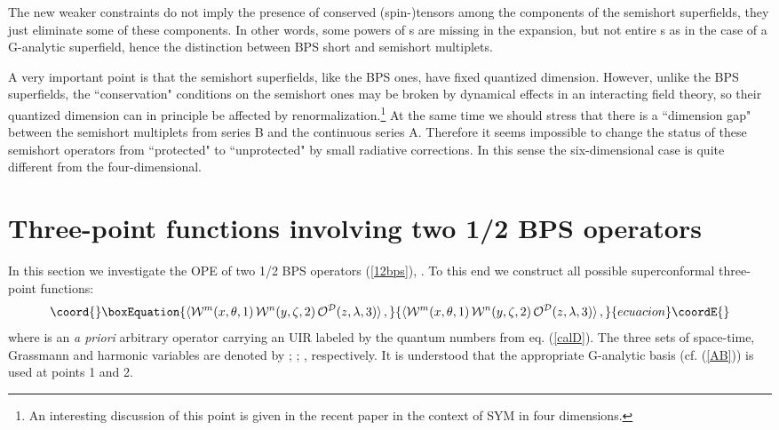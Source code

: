 \documentclass[a4paper,11pt]{article}
\begin{document}
The new weaker constraints do not imply the presence of conserved
(spin-)tensors among the components of the semishort superfields,
they just eliminate some of these components. In other words, some
powers of \myHighlight{$\theta$}\coordHE{}s are missing in the expansion, but not entire
\myHighlight{$\theta^\alpha$}\coordHE{}s as in the case of a G-analytic superfield, hence
the distinction between BPS short and semishort multiplets.

A very important point is that the semishort superfields, like the
BPS ones, have fixed quantized dimension. However, unlike the BPS
superfields, the ``conservation" conditions on the semishort ones
may be broken by dynamical effects in an interacting field theory,
so their quantized dimension can in principle be affected by
renormalization.\footnote{An interesting discussion of this point
is given in the recent paper \cite{HH} in the context of \coordHE{} SYM
in four dimensions.} At the same time we should stress that there
is a ``dimension gap" between the semishort multiplets from series
B and the continuous series A. Therefore it seems impossible to
change the status of these semishort operators from ``protected"
to ``unprotected" by small radiative corrections. In this sense
the six-dimensional case is quite different from the
four-dimensional.


\section{Three-point functions involving two 1/2 BPS operators}


In this section we investigate the OPE of two 1/2 BPS operators (\ref{12bps}),
\coordHE{}. To this end we construct all possible superconformal
three-point functions:
\begin{equation}\coord{}\boxEquation{\label{5.1'}
  \langle {\cal W}^m(x,\theta,1) \,
  {\cal W}^n(y,\zeta,2) \,
  {\cal O}^{{\cal D}}(z,\lambda,3) \rangle \, ,
}{\langle {\cal W}^m(x,\theta,1) \,
  {\cal W}^n(y,\zeta,2) \,
  {\cal O}^{{\cal D}}(z,\lambda,3) \rangle \, ,
}{ecuacion}\coordE{}\end{equation}
where \coordHE{} is an {\it a priori} arbitrary
operator carrying an \coordHE{} UIR labeled by the
quantum numbers \coordHE{} from eq. (\ref{calD}).  The three sets
of space-time, Grassmann and harmonic variables are denoted by
\coordHE{}; \myHighlight{$\theta,\zeta,\lambda$}\coordHE{}; \coordHE{},
respectively. It is understood that the appropriate G-analytic
basis (cf. (\ref{AB})) is used at points 1 and 2.
\end{document}

